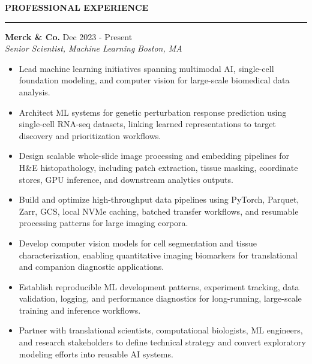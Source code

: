 \documentclass[10pt,letterpaper]{article}
\newcommand{\role}[4]{%
  \textbf{#1} \hfill #2\\
  \textit{#3} \hfill \textit{#4}\vspace{2pt}
}
\newcommand{\resumelist}{\begin{itemize}\setlength{\itemsep}{1.2pt}\setlength{\parskip}{0pt}\setlength{\parsep}{0pt}}
\newcommand{\resumelistend}{\end{itemize}}
\begin{document}
\vspace{6pt}\textcolor{accent}{\large\bfseries PROFESSIONAL EXPERIENCE}\vspace{2pt}\hrule\vspace{4pt}
\role{Merck \& Co.}{Dec 2023 - Present}{Senior Scientist, Machine Learning}{Boston, MA}
\resumelist
  \item Lead machine learning initiatives spanning multimodal AI, single-cell foundation modeling, and computer vision for large-scale biomedical data analysis.
  \item Architect ML systems for genetic perturbation response prediction using single-cell RNA-seq datasets, linking learned representations to target discovery and prioritization workflows.
  \item Design scalable whole-slide image processing and embedding pipelines for H\&E histopathology, including patch extraction, tissue masking, coordinate stores, GPU inference, and downstream analytics outputs.
  \item Build and optimize high-throughput data pipelines using PyTorch, Parquet, Zarr, GCS, local NVMe caching, batched transfer workflows, and resumable processing patterns for large imaging corpora.
  \item Develop computer vision models for cell segmentation and tissue characterization, enabling quantitative imaging biomarkers for translational and companion diagnostic applications.
  \item Establish reproducible ML development patterns, experiment tracking, data validation, logging, and performance diagnostics for long-running, large-scale training and inference workflows.
  \item Partner with translational scientists, computational biologists, ML engineers, and research stakeholders to define technical strategy and convert exploratory modeling efforts into reusable AI systems.
\resumelistend
\end{document}
